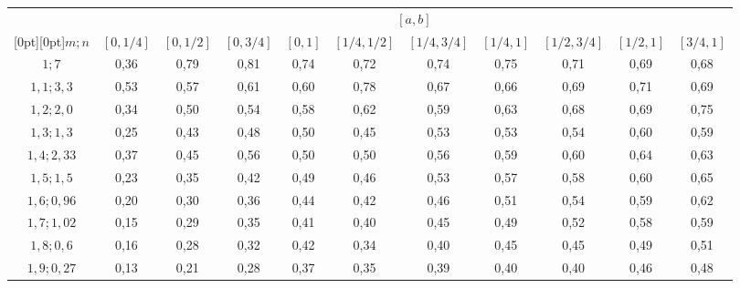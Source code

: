 \begin{table}
\begin{center}
\begin{tabular}{|c|c|c|c|c|c|c|c|c|c|c|}
 \hline
 &\multicolumn{10}{c|}{$[a,b]$}\\
 \cline{2-11}
 \multicolumn{1}{|c|}{\raisebox{6pt}[0pt][0pt]{$m;n$ }}&
  $[0,1/4]$ & $[0,1/2]$ & $[0,3/4]$ &
  $[0,1]$ & $[1/4,1/2]$ & $[1/4,3/4]$ &
  $[1/4,1]$ & $[1/2,3/4]$ & $[1/2,1]$ & $[3/4,1]$\\
 \hline
${1; 7}$&0,36&0,79&0,81&0,74&0,72&0,74&0,75&0,71&0,69&0,68\\
${1,1; 3,3}$&0,53&0,57&0,61&0,60&0,78&0,67&0,66&0,69&0,71&0,69\\
${1,2; 2,0}$&0,34&0,50&0,54&0,58&0,62&0,59&0,63&0,68&0,69&0,75\\
${1,3; 1,3}$&0,25&0,43&0,48&0,50&0,45&0,53&0,53&0,54&0,60&0,59\\
${1,4; 2,33}$&0,37&0,45&0,56&0,50&0,50&0,56&0,59&0,60&0,64&0,63\\
${1,5; 1,5}$&0,23&0,35&0,42&0,49&0,46&0,53&0,57&0,58&0,60&0,65\\
${1,6; 0,96}$&0,20&0,30&0,36&0,44&0,42&0,46&0,51&0,54&0,59&0,62\\
${1,7; 1,02}$&0,15&0,29&0,35&0,41&0,40&0,45&0,49&0,52&0,58&0,59\\
${1,8; 0,6}$&0,16&0,28&0,32&0,42&0,34&0,40&0,45&0,45&0,49&0,51\\
${1,9; 0,27}$&0,13&0,21&0,28&0,37&0,35&0,39&0,40&0,40&0,46&0,48\\
 \hline
 \end{tabular}
 \end{center}
 \end{table}

